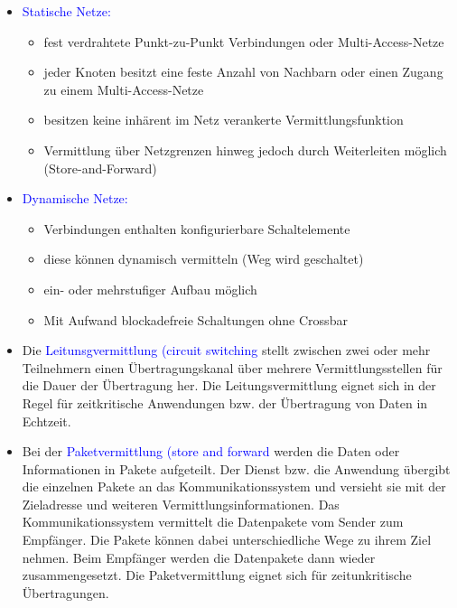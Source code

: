 \begin{itemize}
    \item \textcolor{blue}{Statische Netze:}
    \begin{itemize}
        \item fest verdrahtete Punkt-zu-Punkt Verbindungen oder Multi-Access-Netze
        \item jeder Knoten besitzt eine feste Anzahl von Nachbarn oder einen Zugang zu einem Multi-Access-Netze
        \item besitzen keine inhärent im Netz verankerte Vermittlungsfunktion
        \item Vermittlung über Netzgrenzen hinweg jedoch durch Weiterleiten möglich (Store-and-Forward)
    \end{itemize}
    \item \textcolor{blue}{Dynamische Netze:}
    \begin{itemize}
        \item Verbindungen enthalten konfigurierbare Schaltelemente
        \item diese können dynamisch vermitteln (Weg wird geschaltet)
        \item ein- oder mehrstufiger Aufbau möglich
        \item Mit Aufwand blockadefreie Schaltungen ohne Crossbar
    \end{itemize}
\end{itemize}

\begin{itemize}
    \item Die \textcolor{blue}{Leitunsgvermittlung (circuit switching} stellt zwischen zwei oder mehr Teilnehmern einen Übertragungskanal über mehrere Vermittlungsstellen für die Dauer der Übertragung her.
    Die Leitungsvermittlung eignet sich in der Regel für zeitkritische Anwendungen bzw. der Übertragung von Daten in Echtzeit.
    \item Bei der  \textcolor{blue}{Paketvermittlung (store and forward} werden die Daten oder Informationen in Pakete aufgeteilt.
    Der Dienst bzw. die Anwendung übergibt die einzelnen Pakete an das Kommunikationssystem und versieht sie mit der Zieladresse und weiteren Vermittlungsinformationen.
    Das Kommunikationssystem vermittelt die Datenpakete vom Sender zum Empfänger.
    Die Pakete können dabei unterschiedliche Wege zu ihrem Ziel nehmen.
    Beim Empfänger werden die Datenpakete dann wieder zusammengesetzt.
    Die Paketvermittlung eignet sich für zeitunkritische Übertragungen.
\end{itemize}

